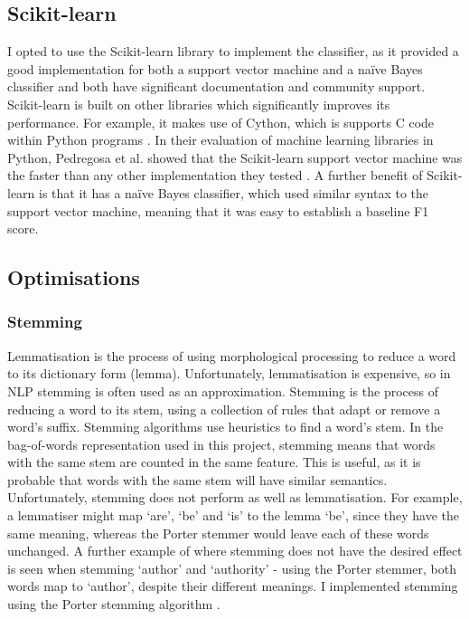 \documentclass[12pt,a4paper,twoside,openright]{report}
\begin{document}
\subsection{Scikit-learn}

I opted to use the Scikit-learn library to implement the classifier, as it provided a good implementation for both a support vector machine and a na\"{i}ve Bayes classifier and both have significant documentation \cite{nbcdocs, svmdocs} and community support. Scikit-learn is built on other libraries which significantly improves its performance. For example, it makes use of Cython, which is supports C code within Python programs \cite{cythondocs}. In their evaluation of machine learning libraries in Python, Pedregosa et al. showed that the Scikit-learn support vector machine was the faster than any other implementation they tested \cite{skspeed}. A further benefit of Scikit-learn is that it has a na\"{i}ve Bayes classifier, which used similar syntax to the support vector machine, meaning that it was easy to establish a baseline F1 score.

\subsection{Optimisations} \label{impl-optimisations}

\subsubsection{Stemming} \label{impl-stem}

Lemmatisation is the process of using morphological processing to reduce a word to its dictionary form (lemma). Unfortunately, lemmatisation is expensive, so in NLP stemming is often used as an approximation. Stemming is the process of reducing a word to its stem, using a collection of rules that adapt or remove a word's suffix. Stemming algorithms use heuristics to find a word's stem. In the bag-of-words representation used in this project, stemming means that words with the same stem are counted in the same feature. This is useful, as it is probable that words with the same stem will have similar semantics. Unfortunately, stemming does not perform as well as lemmatisation. For example, a lemmatiser might map `are', `be' and `is' to the lemma `be', since they have the same meaning, whereas the Porter stemmer would leave each of these words unchanged. A further example of where stemming does not have the desired effect is seen when stemming `author' and `authority' - using the Porter stemmer, both words map to `author', despite their different meanings. I implemented stemming using the Porter stemming algorithm \cite{porter1980algorithm}.
\end{document}
